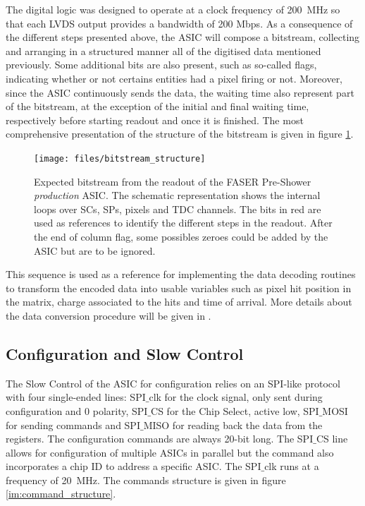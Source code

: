 			The digital logic was designed to operate at a clock frequency of \SI{200}{\mega\hertz} so that each LVDS output provides a bandwidth of 200 Mbps. As a consequence of the different steps presented above, the ASIC will compose a bitstream, collecting and arranging in a structured manner all of the digitised data mentioned previously. Some additional bits are also present, such as so-called flags, indicating whether or not certains entities had a pixel firing or not. Moreover, since the ASIC continuously sends the data, the waiting time also represent part of the bitstream, at the exception of the initial and final waiting time, respectively before starting readout and once it is finished. The most comprehensive presentation of the structure of the bitstream is given in figure \ref{im:bitstream_structure}.
			\clearpage
			\begin{figure}[h]
				\centering
				\texttt{[image: files/bitstream\_structure]}
				\caption{Expected bitstream from the readout of the FASER Pre-Shower \textit{production} ASIC. The schematic representation shows the internal loops over SCs, SPs, pixels and TDC channels. The bits in red are used as references to identify the different steps in the readout. After the end of column flag, some possibles zeroes could be added by the ASIC but are to be ignored. }
				\label{im:bitstream_structure}
			\end{figure}
			\clearpage
			This sequence is used as a reference for implementing the data decoding routines to transform the encoded data into usable variables such as pixel hit position in the matrix, charge associated to the hits and time of arrival. More details about the data conversion procedure will be given in . 

		\subsection{Configuration and Slow Control}
		The Slow Control of the ASIC for configuration relies on an SPI-like protocol with four single-ended lines: SPI$\_$clk for the clock signal, only sent during configuration and 0 polarity, SPI$\_$CS for the Chip Select, active low, SPI$\_$MOSI for sending commands and SPI$\_$MISO for reading back the data from the registers. The configuration commands are always 20-bit long. The SPI$\_$CS line allows for configuration of multiple ASICs in parallel but the command also incorporates a chip ID to address a specific ASIC. The SPI$\_$clk runs at a frequency of \SI{20}{\mega\hertz}. The commands structure is given in figure \ref{im:command_structure}. 
		
